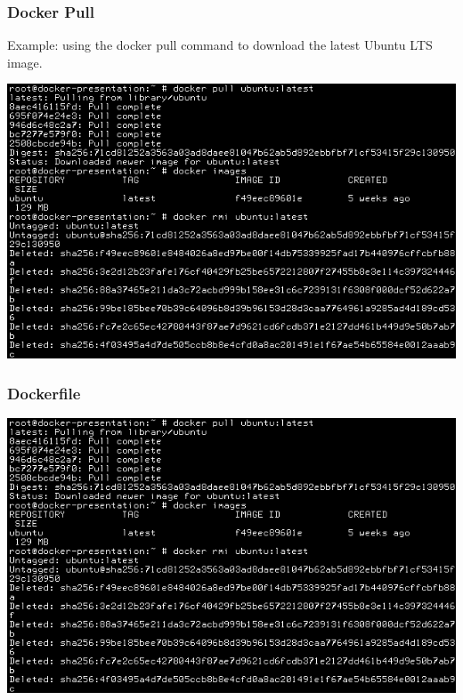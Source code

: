 \documentclass[helvetica,english,utf8,notitle,nologo]{beamer}
\begin{document}
\begin{frame}
  \frametitle{Docker Pull}

  Example: using the docker pull command to download the latest Ubuntu
  LTS image.

  \includegraphics[scale=0.48]{image_1}
\end{frame}

\begin{frame}
  \frametitle{Dockerfile}

  

  \includegraphics[scale=0.48]{image_1}
\end{frame}
\end{document}
